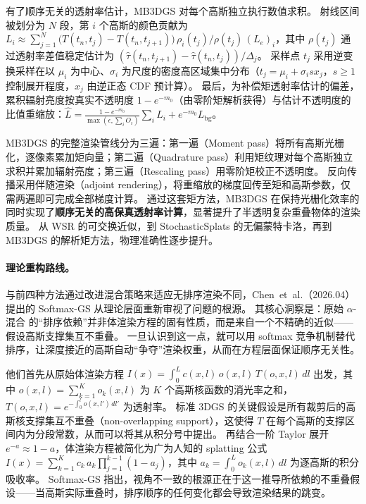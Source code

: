有了顺序无关的透射率估计，MB3DGS 对每个高斯独立执行数值求积。
射线区间被划分为 $N$ 段，第 $i$ 个高斯的颜色贡献为 $L_i \approx \sum_{j=1}^{N} \bigl(T(t_n, t_j) - T(t_n, t_{j+1})\bigr)\,\rho_i(t_j)/\rho(t_j)\,(L_e)_i$，其中 $\rho(t_j)$ 通过透射率差值稳定估计为 $(\hat{\tau}(t_n, t_{j+1}) - \hat{\tau}(t_n, t_j))/\Delta_j$。
采样点 $t_j$ 采用逆变换采样在以 $\mu_i$ 为中心、$\sigma_i$ 为尺度的密度高区域集中分布（$t_j = \mu_i + \sigma_i s x_j$，$s \geq 1$ 控制展开程度，$x_j$ 由逆正态 CDF 预计算）。
最后，为补偿矩透射率估计的偏差，累积辐射亮度按真实不透明度 $1 - e^{-m_0}$（由零阶矩解析获得）与估计不透明度的比值重缩放：$\hat{L} = \frac{1 - e^{-m_0}}{\max(\epsilon, \sum_i O_i)}\sum_i L_i + e^{-m_0} L_{\mathrm{bg}}$。

MB3DGS 的完整渲染管线分为三遍：第一遍（Moment pass）将所有高斯光栅化，逐像素累加矩向量；第二遍（Quadrature pass）利用矩纹理对每个高斯独立求积并累加辐射亮度；第三遍（Rescaling pass）用零阶矩校正不透明度。
反向传播采用伴随渲染（adjoint rendering），将重缩放的梯度回传至矩和高斯参数，仅需两遍即可完成全部梯度计算。
通过这套矩方法，MB3DGS 在保持光栅化效率的同时实现了\textbf{顺序无关的高保真透射率计算}，显著提升了半透明复杂重叠物体的渲染质量。
从 WSR 的可交换近似，到 StochasticSplats 的无偏蒙特卡洛，再到 MB3DGS 的解析矩方法，物理准确性逐步提升。

\paragraph{理论重构路线。}
与前四种方法通过改进混合策略来适应无排序渲染不同，Chen~et~al.（2026.04）~\cite{2604_27437} 提出的 Softmax-GS 从理论层面重新审视了问题的根源。
其核心洞察是：原始 $\alpha$-混合 的“排序依赖”并非体渲染方程的固有性质，而是来自一个不精确的近似——假设高斯支撑集互不重叠。
一旦认识到这一点，就可以用 softmax 竞争机制替代排序，让深度接近的高斯自动“争夺”渲染权重，从而在方程层面保证顺序无关性。

他们首先从原始体渲染方程 $I(x) = \int_0^L c(x,l)\,o(x,l)\,T(o,x,l)\,dl$ 出发，其中 $o(x,l) = \sum_{k=1}^K o_k(x,l)$ 为 $K$ 个高斯核函数的消光率之和，$T(o,x,l) = e^{-\int_0^l o(x,l')\,dl'}$ 为透射率。
标准 3DGS 的关键假设是所有裁剪后的高斯核支撑集互不重叠（non-overlapping support），这使得 $T$ 在每个高斯的支撑区间内为分段常数，从而可以将其从积分号中提出。
再结合一阶 Taylor 展开 $e^{-a} \approx 1 - a$，体渲染方程被简化为广为人知的 splatting 公式 $I(x) = \sum_{k=1}^K c_k\,a_k \prod_{j=1}^{k-1}(1-a_j)$，其中 $a_k = \int_0^L o_k(x,l)\,dl$ 为逐高斯的积分吸收率。
Softmax-GS 指出，视角不一致的根源正在于这一推导所依赖的不重叠假设——当高斯实际重叠时，排序顺序的任何变化都会导致渲染结果的跳变。


